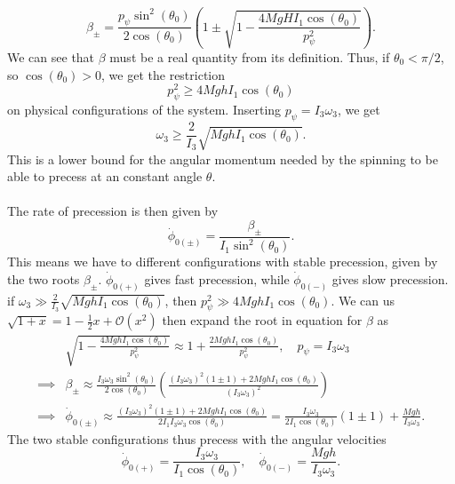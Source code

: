 \documentclass{article}
\begin{document}
        \begin{equation*}
            \beta_\pm = \frac{p_\psi \sin^2(\theta_0)}{2 \cos(\theta_0)} \left( 1 \pm \sqrt{1 - \frac{4 M g H I_1 \cos(\theta_0)}{p_\psi^2}} \right).
        \end{equation*}
        We can see that $\beta$ must be a real quantity from its definition. Thus, if $\theta_0 < \pi / 2$, so $\cos(\theta_0) > 0$, we get the restriction
        \begin{equation*}
            p_\psi^2 \geq 4 M g h I_1 \cos(\theta_0)
        \end{equation*}
        on physical configurations of the system. Inserting $p_\psi = I_3 \omega_3$, we get
        \begin{equation*}
            \omega_3 \geq \frac{2}{I_3} \sqrt{MghI_1 \cos(\theta_0)}.
        \end{equation*}
        This is a lower bound for the angular momentum needed by the spinning to be able to precess at an constant angle $\theta$. \\ \\
        The rate of precession is then given by
        \begin{equation*}
            \dot \phi_{0(\pm)} = \frac{\beta_\pm}{I_1 \sin^2(\theta_0)}.
        \end{equation*}
        This means we have to different configurations with stable precession, given by the two roots $\beta_\pm$. $\dot \phi_{0(+)}$ gives fast precession, while $\dot \phi_{0(-)}$ gives slow precession. if $\omega_3 \gg \frac{2}{I_3}\sqrt{MghI_1 \cos(\theta_0) }$, then $p_\psi^2 \gg 4 M g h I_1 \cos(\theta_0)$. We can us $\sqrt{1 + x} = 1 - \frac{1}{2} x + \mathcal{O}(x^2)$ then expand the root in equation for $\beta$ as
        \begin{align*}
            & \sqrt{1 - \frac{4 M g h I_1 \cos(\theta_0)}{p_\psi^2}} \approx 1 +\frac{2 M g h I_1 \cos(\theta_0)}{p_\psi^2}, \quad p_\psi = I_3 \omega_3  \\
            \implies &\beta_\pm \approx \frac{I_3 \omega_3 \sin^2(\theta_0)}{2 \cos(\theta_0)} \left(\frac{ (I_3 \omega_3 )^2 (1\pm 1) + 2 M g h I_1 \cos(\theta_0)}{(I_3 \omega_3)^2} \right) \\
            \implies & \dot \phi_{0(\pm)} \approx \frac{ (I_3 \omega_3 )^2(1\pm 1) + 2 M g h I_1 \cos(\theta_0)}{2 I_1 I_3 \omega_3 \cos(\theta_0)} = \frac{I_3 \omega_3}{2 I_1 \cos(\theta_0)} (1\pm 1) + \frac{Mgh}{I_3 \omega_3}.
        \end{align*}
        The two stable configurations thus precess with the angular velocities
        \begin{equation*}
            \dot \phi_{0(+)} = \frac{I_3 \omega_3}{I_1 \cos(\theta_0)}, \quad \dot \phi_{0(-)} = \frac{Mgh}{I_3 \omega_3}.
        \end{equation*}
\end{document}
